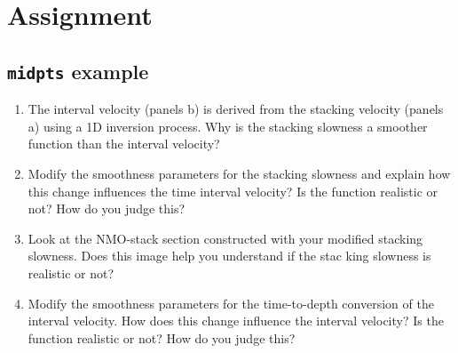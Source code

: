 \section{Assignment}

\subsection{\texttt{midpts} example}
\begin{enumerate}
\item The interval velocity (panels b) is derived from the stacking
  velocity (panels a) using a 1D inversion process. Why is the stacking
  slowness a smoother function than the interval velocity?
\item Modify the smoothness parameters for the stacking slowness and
  explain how this change influences the time interval velocity? Is
  the function realistic or not? How do you judge this?
\item Look at the NMO-stack section constructed with your modified
  stacking slowness. Does this image help you understand if the
  stac
  king slowness is realistic or not?
\item Modify the smoothness parameters for the time-to-depth
  conversion of the interval velocity. How does this change influence
  the interval velocity? Is the function realistic or not? How do you
  judge this?
\end{enumerate}

